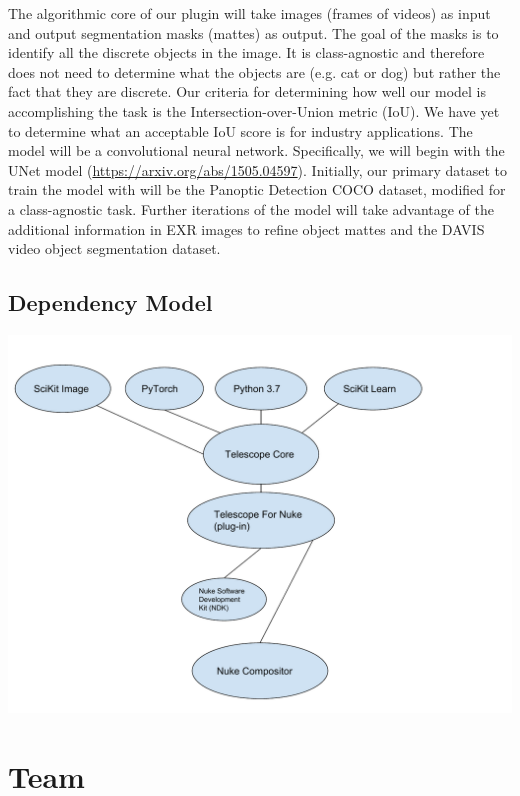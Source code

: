 \documentclass[15pt]{article}
\begin{document}
The algorithmic core of our plugin will take images (frames of videos) as input and output segmentation masks (mattes) as output. The goal of the masks is to identify all the discrete objects in the image. It is class-agnostic and therefore does not need to determine what the objects are (e.g. cat or dog) but rather the fact that they are discrete.
Our criteria for determining how well our model is accomplishing the task is the Intersection-over-Union metric (IoU). We have yet to determine what an acceptable IoU score is for industry applications.
The model will be a convolutional neural network. Specifically, we will begin with the UNet model (\url{https://arxiv.org/abs/1505.04597}). Initially, our primary dataset to train the model with will be the Panoptic Detection COCO dataset, modified for a class-agnostic task.
Further iterations of the model will take advantage of the additional information in EXR images to refine object mattes and the DAVIS video object segmentation dataset.

\subsection{Dependency Model}
\label{sec:orgb6f315a}
\begin{center}
\includegraphics[width=18cm]{./Dgraph.pdf}
\end{center}


\section{Team}
\label{sec:org5549106}
\end{document}

